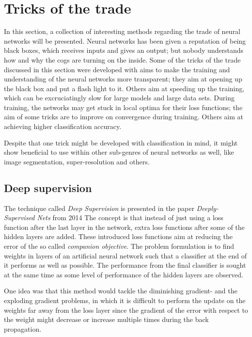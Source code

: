 \section{Tricks of the trade}
In this section, a collection of interesting methods regarding the trade of neural networks will be presented. Neural networks has been given a reputation of being black boxes, which receives inputs and gives an output; but nobody understands how and why the cogs are turning on the inside. Some of the tricks of the trade discussed in this section were developed with aims to make the training and understanding of the neural networks more transparent; they aim at opening up the black box and put a flash light to it. Others aim at speeding up the training, which can be excruciatingly slow for large models and large data sets. During training, the networks may get stuck in local optima for their loss functions; the aim of some tricks are to improve on convergence during training. Others aim at achieving higher classification accuracy. 

Despite that one trick might be developed with classification in mind, it might show beneficial to use within other sub-genres of neural networks as well, like image segmentation, super-resolution and others. 

\subsection{Deep supervision}
The technique called \emph{Deep Supervision} is presented in the paper \emph{Deeply-Supervised Nets} from 2014 %
The concept is that instead of just using a loss function after the last layer in the network, extra loss functions after some of the hidden layers are added. These introduced loss functions aim at reducing the error of the so called \emph{companion objective}. The problem formulation is to find weights in layers of an artificial neural network such that a classifier at the end of it performs as well as possible. The performance from the final classifier is sought at the same time as some level of performance of the hidden layers are observed. 

One idea was that this method would tackle the diminishing gradient- and the exploding gradient problems, in which it is difficult to perform the update on the weights far away from the loss layer since the gradient of the error with respect to the weight might decrease or increase multiple times during the back propagation. 

